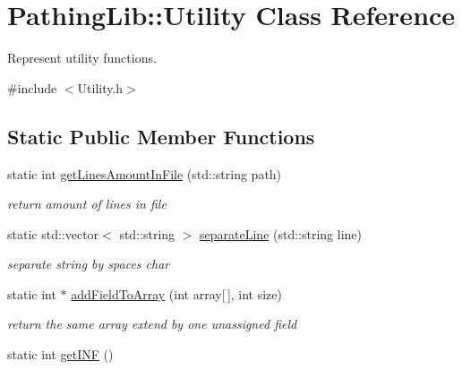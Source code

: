 \hypertarget{class_pathing_lib_1_1_utility}{}\section{Pathing\+Lib\+:\+:Utility Class Reference}
\label{class_pathing_lib_1_1_utility}


Represent utility functions.  




{\ttfamily \#include $<$Utility.\+h$>$}

\subsection*{Static Public Member Functions}
\begin{DoxyCompactItemize}
\item 
static int \hyperlink{class_pathing_lib_1_1_utility_a72666c060a013dd7a0d285131df28cb2}{get\+Lines\+Amount\+In\+File} (std\+::string path)\hypertarget{class_pathing_lib_1_1_utility_a72666c060a013dd7a0d285131df28cb2}{}\label{class_pathing_lib_1_1_utility_a72666c060a013dd7a0d285131df28cb2}

\begin{DoxyCompactList}\small\item\em return amount of lines in file \end{DoxyCompactList}\item 
static std\+::vector$<$ std\+::string $>$ \hyperlink{class_pathing_lib_1_1_utility_a8edc29cdaebf8333f5b96ab0b18bfaf1}{separate\+Line} (std\+::string line)\hypertarget{class_pathing_lib_1_1_utility_a8edc29cdaebf8333f5b96ab0b18bfaf1}{}\label{class_pathing_lib_1_1_utility_a8edc29cdaebf8333f5b96ab0b18bfaf1}

\begin{DoxyCompactList}\small\item\em separate string by spaces char \end{DoxyCompactList}\item 
static int $\ast$ \hyperlink{class_pathing_lib_1_1_utility_a68145b2fec645b07f45a3c47f67513ab}{add\+Field\+To\+Array} (int array\mbox{[}$\,$\mbox{]}, int size)\hypertarget{class_pathing_lib_1_1_utility_a68145b2fec645b07f45a3c47f67513ab}{}\label{class_pathing_lib_1_1_utility_a68145b2fec645b07f45a3c47f67513ab}

\begin{DoxyCompactList}\small\item\em return the same array extend by one unassigned field \end{DoxyCompactList}\item 
static int \hyperlink{class_pathing_lib_1_1_utility_a2fdc115ff5b8b8b5f2eec8f4fe3990a4}{get\+I\+NF} ()\hypertarget{class_pathing_lib_1_1_utility_a2fdc115ff5b8b8b5f2eec8f4fe3990a4}{}\label{class_pathing_lib_1_1_utility_a2fdc115ff5b8b8b5f2eec8f4fe3990a4}


\end{DoxyCompactItemize}
